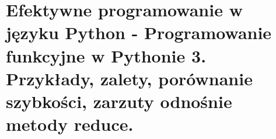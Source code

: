 \section{Efektywne programowanie w języku Python - Programowanie funkcyjne w Pythonie 3. Przykłady, zalety, porównanie szybkości, zarzuty odnośnie metody reduce.}